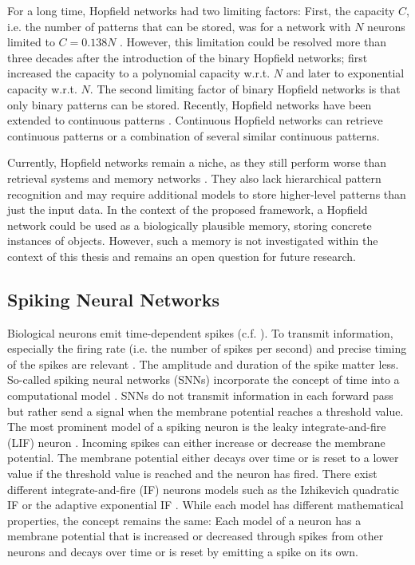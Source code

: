 For a long time, Hopfield networks had two limiting factors: First, the capacity $C$, i.e. the number of patterns that can be stored, was for a network with $N$ neurons limited to $C=0.138N$ .
However, this limitation could be resolved more than three decades after the introduction of the binary Hopfield networks; 
 first increased the capacity to a polynomial capacity w.r.t. $N$ and  later to exponential capacity w.r.t. $N$.
The second limiting factor of binary Hopfield networks is that only binary patterns can be stored.
Recently, Hopfield networks have been extended to continuous patterns .
Continuous Hopfield networks can retrieve continuous patterns or a combination of several similar continuous patterns.

Currently, Hopfield networks remain a niche, as they still perform worse than retrieval systems  and memory networks .
They also lack hierarchical pattern recognition and may require additional models to store higher-level patterns than just the input data.
In the context of the proposed framework, a Hopfield network could be used as a biologically plausible memory, storing concrete instances of objects.
However, such a memory is not investigated within the context of this thesis and remains an open question for future research.


\subsection{Spiking Neural Networks}
Biological neurons emit time-dependent spikes (c.f. ).
To transmit information, especially the firing rate (i.e. the number of spikes per second) and precise timing of the spikes are relevant .
The amplitude and duration of the spike matter less.
So-called spiking neural networks (SNNs) incorporate the concept of time into a computational model .
SNNs do not transmit information in each forward pass but rather send a signal when the membrane potential reaches a threshold value. 
The most prominent model of a spiking neuron is the leaky integrate-and-fire (LIF) neuron .
Incoming spikes can either increase or decrease the membrane potential.
The membrane potential either decays over time or is reset to a lower value if the threshold value is reached and the neuron has fired.
There exist different integrate-and-fire (IF) neurons models such as the Izhikevich quadratic IF  or the adaptive exponential IF .
While each model has different mathematical properties, the concept remains the same: Each model of a neuron has a membrane potential that is increased or decreased through spikes from other neurons and decays over time or is reset by emitting a spike on its own.


